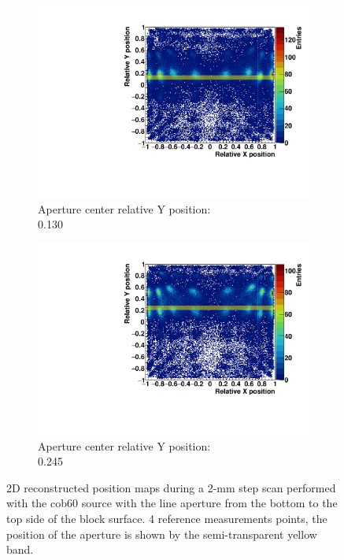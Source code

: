\begin{figure}
\begin{subfigure}[t]{0.5\textwidth}
\centering
\includegraphics[width=\textwidth]{03_GraphicFiles/chapter3_CLaRySproto/Absorber/images_scan/line_2mm_vert/run14_floodMap.pdf}
\caption{Aperture center relative Y position: \\ 0.130}
\label{chap3::fig::scan_map3_vert}
\end{subfigure}
\begin{subfigure}[t]{0.5\textwidth}
\centering
\includegraphics[width=\textwidth]{03_GraphicFiles/chapter3_CLaRySproto/Absorber/images_scan/line_2mm_vert/run15_floodMap.pdf}
\caption{Aperture center relative Y position: \\ 0.245}
\label{chap3::fig::scan_map4_vert}
\end{subfigure}
\caption{2D reconstructed position maps during a 2-mm step scan performed with the \gls{cob60} source with the line aperture from the bottom to the top side of the block surface. 4 reference measurements points, the position of the aperture is shown by the semi-transparent yellow band.}
\label{chap3::fig::ScanFloodMap_Vert}
\end{figure}


